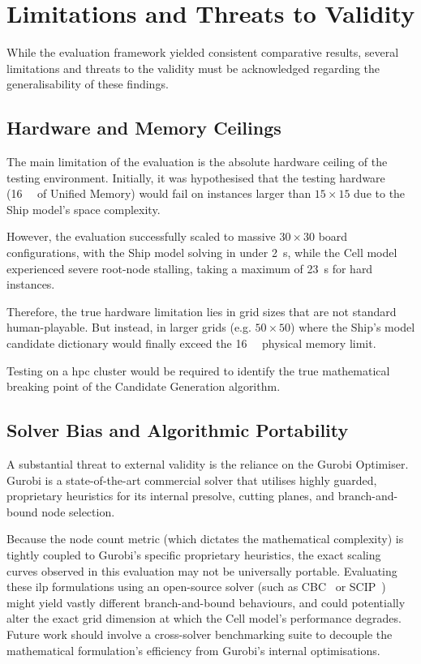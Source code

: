 \section{Limitations and Threats to Validity}\label{sec:limitations-threats-validity}
While the evaluation framework yielded consistent comparative results, several limitations and threats to the validity must be acknowledged regarding the generalisability of these findings.

\subsection{Hardware and Memory Ceilings}\label{subsec:hardware-memory-ceilings}
The main limitation of the evaluation is the absolute hardware ceiling of the testing environment. Initially, it was hypothesised that the testing hardware (\SI{16}{\giga\byte} of Unified Memory) would fail on instances larger than $15 \times 15$ due to the Ship model's space complexity. 

However, the evaluation successfully scaled to massive $30 \times 30$ board configurations, with the Ship model solving in under \SI{2}{\second}, while the Cell model experienced severe root-node stalling, taking a maximum of \SI{23}{\second} for hard instances. 

Therefore, the true hardware limitation lies in grid sizes that are not standard human-playable. But instead, in larger grids (e.g. $50 \times 50$) where the Ship's model candidate dictionary would finally exceed the \SI{16}{\giga\byte} physical memory limit.

Testing on a \gls{hpc} cluster would be required to identify the true mathematical breaking point of the Candidate Generation algorithm.

\subsection{Solver Bias and Algorithmic Portability}\label{subsec:solver-bias}
A substantial threat to external validity is the reliance on the Gurobi Optimiser. Gurobi is a state-of-the-art commercial solver that utilises highly guarded, proprietary heuristics for its internal presolve, cutting planes, and branch-and-bound node selection.

Because the node count metric (which dictates the mathematical complexity) is tightly coupled to Gurobi's specific proprietary heuristics, the exact scaling curves observed in this evaluation may not be universally portable. Evaluating these \gls{ilp} formulations using an open-source solver (such as CBC~\citep{coin-orcbc} or SCIP~\citep{achterberg2009scip}) might yield vastly different branch-and-bound behaviours, and could potentially alter the exact grid dimension at which the Cell model's performance degrades. Future work should involve a cross-solver benchmarking suite to decouple the mathematical formulation's efficiency from Gurobi's internal optimisations.

